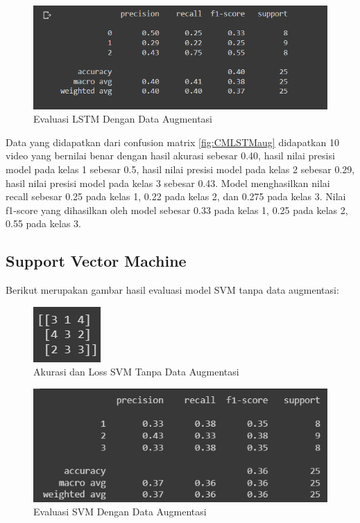 \begin{figure} [H] \centering
  \includegraphics[scale=0.75]{gambar/scoreLSTMaug.png}
  \caption{Evaluasi LSTM Dengan Data Augmentasi}
  \label{fig:ScoreLSTMaug}
\end{figure}
Data yang didapatkan dari confusion matrix \ref{fig:CMLSTMaug} didapatkan 10 video yang bernilai benar
dengan hasil akurasi sebesar 0.40, hasil nilai presisi model pada kelas 1 sebesar 0.5, hasil nilai
presisi model pada kelas 2 sebesar 0.29, hasil nilai presisi model pada kelas 3 sebesar 0.43. Model menghasilkan
nilai recall sebesar 0.25 pada kelas 1, 0.22 pada kelas 2, dan 0.275 pada kelas 3. Nilai f1-score yang dihasilkan
oleh model sebesar 0.33 pada kelas 1, 0.25 pada kelas 2, 0.55 pada kelas 3.

\subsection{Support Vector Machine}
Berikut merupakan gambar hasil evaluasi model SVM tanpa data augmentasi:

\newpage
\begin{figure} [H] \centering
  \includegraphics[scale=5]{gambar/CMSVMnoAug.png}
  \caption{Akurasi dan Loss SVM Tanpa Data Augmentasi}
  \label{fig:CMSVMnoaug}
\end{figure}

\begin{figure} [H] \centering
  \includegraphics[scale=1]{gambar/scoreSVMnoaug.png}
  \caption{Evaluasi SVM Dengan Data Augmentasi}
  \label{fig:ScoreSVMnoaug}
\end{figure}

